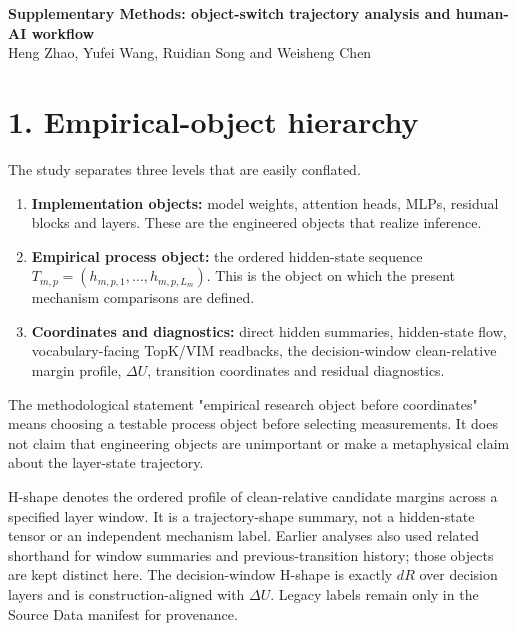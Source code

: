 \documentclass[10pt]{article}
\begin{document}
\begin{center}
{\Large\bfseries\sffamily Supplementary Methods: object-switch trajectory analysis and human-AI workflow}\\[0.5em]
{\normalsize Heng Zhao, Yufei Wang, Ruidian Song and Weisheng Chen}
\end{center}
\section*{1. Empirical-object hierarchy}

The study separates three levels that are easily conflated.

\begin{enumerate}[leftmargin=1.6em,itemsep=0.2em,topsep=0.2em]

\item \textbf{Implementation objects:} model weights, attention heads, MLPs, residual blocks and layers. These are the engineered objects that realize inference.

\item \textbf{Empirical process object:} the ordered hidden-state sequence \(T_{m,p}=(h_{m,p,1},\ldots,h_{m,p,L_m})\). This is the object on which the present mechanism comparisons are defined.

\item \textbf{Coordinates and diagnostics:} direct hidden summaries, hidden-state flow, vocabulary-facing TopK/VIM readbacks, the decision-window clean-relative margin profile, \(\Delta U\), transition coordinates and residual diagnostics.

\end{enumerate}

The methodological statement "empirical research object before coordinates" means choosing a testable process object before selecting measurements. It does not claim that engineering objects are unimportant or make a metaphysical claim about the layer-state trajectory.

H-shape denotes the ordered profile of clean-relative candidate margins across a specified layer window. It is a trajectory-shape summary, not a hidden-state tensor or an independent mechanism label. Earlier analyses also used related shorthand for window summaries and previous-transition history; those objects are kept distinct here. The decision-window H-shape is exactly \(dR\) over decision layers and is construction-aligned with \(\Delta U\). Legacy labels remain only in the Source Data manifest for provenance.
\end{document}
